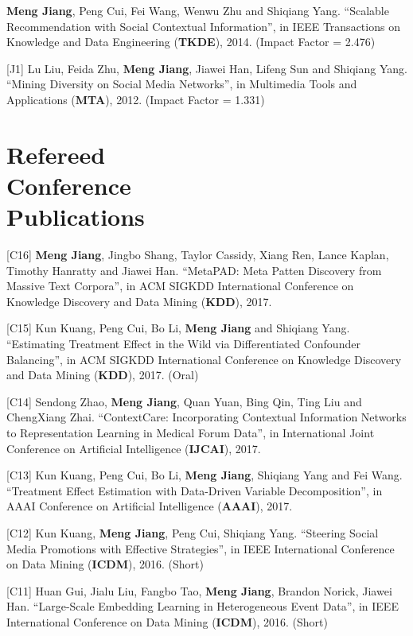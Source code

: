 \documentclass[margin, 9pt]{res}
\begin{document}
\begin{resume}
[J2] \textbf{Meng Jiang}, Peng Cui, Fei Wang, Wenwu Zhu and Shiqiang Yang. ``Scalable Recommendation with Social Contextual Information'', in IEEE Transactions on Knowledge and Data Engineering (\textbf{TKDE}), 2014. (Impact Factor = 2.476)

[J1] Lu Liu, Feida Zhu, \textbf{Meng Jiang}, Jiawei Han, Lifeng Sun and Shiqiang Yang. ``Mining Diversity on Social Media Networks'', in Multimedia Tools and Applications (\textbf{MTA}), 2012. (Impact Factor = 1.331)


\section{Refereed \\ Conference \\ Publications}

[C16] \textbf{Meng Jiang}, Jingbo Shang, Taylor Cassidy, Xiang Ren, Lance Kaplan, Timothy Hanratty and Jiawei Han. ``MetaPAD: Meta Patten Discovery from Massive Text Corpora'', in ACM SIGKDD International Conference on Knowledge Discovery and Data Mining (\textbf{KDD}), 2017.

[C15] Kun Kuang, Peng Cui, Bo Li, \textbf{Meng Jiang} and Shiqiang Yang. ``Estimating Treatment Effect in the Wild via Differentiated Confounder Balancing'', in ACM SIGKDD International Conference on Knowledge Discovery and Data Mining (\textbf{KDD}), 2017. (Oral)

[C14] Sendong Zhao, \textbf{Meng Jiang}, Quan Yuan, Bing Qin, Ting Liu and ChengXiang Zhai. ``ContextCare: Incorporating Contextual Information Networks to Representation Learning in Medical Forum Data'', in International Joint Conference on Artificial Intelligence (\textbf{IJCAI}), 2017.

[C13] Kun Kuang, Peng Cui, Bo Li, \textbf{Meng Jiang}, Shiqiang Yang and Fei Wang. ``Treatment Effect Estimation with Data-Driven Variable Decomposition'', in AAAI Conference on Artificial Intelligence (\textbf{AAAI}), 2017.

[C12] Kun Kuang, \textbf{Meng Jiang}, Peng Cui, Shiqiang Yang. ``Steering Social Media Promotions with Effective Strategies'', in IEEE International Conference on Data Mining (\textbf{ICDM}), 2016. (Short)

[C11] Huan Gui, Jialu Liu, Fangbo Tao, \textbf{Meng Jiang}, Brandon Norick, Jiawei Han. ``Large-Scale Embedding Learning in Heterogeneous Event Data'', in IEEE International Conference on Data Mining (\textbf{ICDM}), 2016. (Short)


\end{resume}
\end{document}
